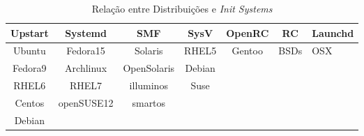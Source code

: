 \begin{table}[H]
\centering
\caption{Relação entre Distribuições e \textit{Init Systems}}
\label{tab:inits-distro}
\begin{tabular}{|c|cccccl}
\hline
\rowcolor[HTML]{C0C0C0} 
Upstart & \multicolumn{1}{c|}{\cellcolor[HTML]{C0C0C0}Systemd} & \multicolumn{1}{c|}{\cellcolor[HTML]{C0C0C0}SMF} & \multicolumn{1}{c|}{\cellcolor[HTML]{C0C0C0}SysV} & \multicolumn{1}{c|}{\cellcolor[HTML]{C0C0C0}OpenRC} & \multicolumn{1}{c|}{\cellcolor[HTML]{C0C0C0}RC} & \multicolumn{1}{l|}{\cellcolor[HTML]{C0C0C0}Launchd} \\ \hline
Ubuntu  & \multicolumn{1}{c|}{Fedora15}                        & \multicolumn{1}{c|}{Solaris}                     & \multicolumn{1}{c|}{RHEL5}                        & \multicolumn{1}{c|}{Gentoo}                         & \multicolumn{1}{c|}{BSDs}                       & \multicolumn{1}{l|}{OSX}                             \\ \hline
Fedora9 & \multicolumn{1}{c|}{Archlinux}                       & \multicolumn{1}{c|}{OpenSolaris}                 & \multicolumn{1}{c|}{Debian}                       &                                                     &                                                 &                                                      \\ \cline{1-4}
RHEL6   & \multicolumn{1}{c|}{RHEL7}                           & \multicolumn{1}{c|}{illuminos}                   & \multicolumn{1}{c|}{Suse}                         &                                                     &                                                 &                                                      \\ \cline{1-4}
Centos  & \multicolumn{1}{c|}{openSUSE12}                      & \multicolumn{1}{c|}{smartos}                     &                                                   &                                                     &                                                 &                                                      \\ \cline{1-3}
Debian  &                                                      &                                                  &                                                   &                                                     &                                                 &                                                      \\ \cline{1-1}
\end{tabular}
\end{table}

